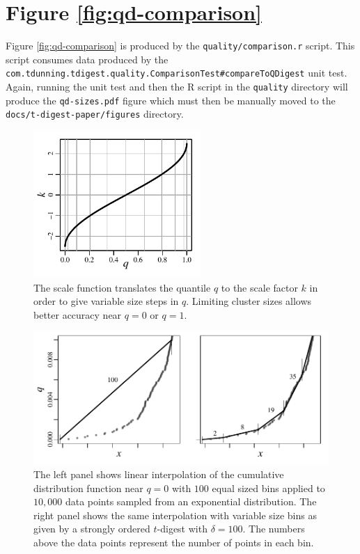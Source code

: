 \documentclass[]{statsoc}
\begin{document}
\section*{Figure \ref{fig:qd-comparison}}
Figure \ref{fig:qd-comparison} is produced by the {\tt quality/comparison.r} script. This script consumes data produced by the {\tt com.tdunning.tdigest.quality.ComparisonTest\#compareToQDigest} unit test. Again, running the unit test and then the R script in the {\tt quality} directory will produce the {\tt qd-sizes.pdf} figure which must then be manually moved to the {\tt docs/t-digest-paper/figures} directory.
\begin{figure}[p] %
   \centering
   \includegraphics[width=2.5in]{figures/k-q-plot.pdf} 
   \caption{The scale function translates the quantile $q$ to the scale factor $k$ in order to give variable size steps in $q$. Limiting cluster sizes allows better accuracy near $q=0$ or $q=1$. }
   \label{fig:k-q-plot}
\end{figure}
\begin{figure}[p] %
   \centering
   \includegraphics[height=2.in, clip]{figures/linear-interpolation.pdf} 
   \caption{The left panel shows linear interpolation of the cumulative distribution function near $q=0$ with $100$ equal sized bins applied to $10,000$ data points sampled from an exponential distribution. The right panel shows the same interpolation with variable size bins as given by a strongly ordered $t$-digest with $\delta=100$. The numbers above the data points represent the number of points in each bin. }
   \label{fig:linear-interpolation}
\end{figure}
\end{document}
